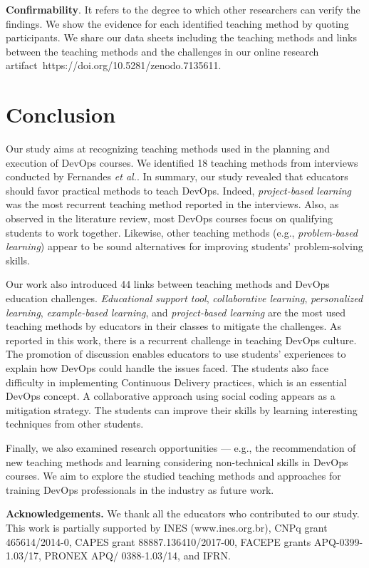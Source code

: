 \documentclass[10pt,conference]{IEEEtran}
\begin{document}
{\textbf{Confirmability}.} It refers to the degree to which other researchers can verify the findings. We show the evidence for each identified teaching method by quoting participants. We share our data sheets including the teaching methods and links between the teaching methods and the challenges in our online research artifact~https://doi.org/10.5281/zenodo.7135611.


\section{Conclusion}   \label{sec:conclusion}


Our study aims at recognizing teaching methods used in the planning and execution of DevOps courses. We identified 18 teaching methods from interviews conducted by Fernandes \textit{et al.}\cite{fernandes:2022}. In summary, our study revealed that educators should favor practical methods to teach DevOps. Indeed, \textit{project-based learning} was the most recurrent teaching method reported in the interviews. Also, as observed in the literature review, most DevOps courses focus on qualifying students to work together. Likewise, other teaching methods (e.g., \textit{problem-based learning}) appear to be sound alternatives for improving students' problem-solving skills.


Our work also introduced 44 links between teaching methods and DevOps education challenges. \textsl{Educational support tool}, \textsl{collaborative learning}, \textsl{personalized learning}, \textsl{example-based learning}, and \textsl{project-based learning} are the most used teaching methods by educators in their classes to mitigate the challenges. As reported in this work, there is a recurrent challenge in teaching DevOps culture.  The promotion of discussion enables educators to use students' experiences to explain how DevOps could handle the issues faced.  The students also face difficulty in implementing Continuous Delivery practices, which is an essential DevOps concept. A collaborative approach using social coding appears as a mitigation strategy. The students can improve their skills by learning interesting techniques from other students.

Finally, we also examined research opportunities — e.g., the recommendation of new teaching methods and learning considering non-technical skills in DevOps courses. We aim to explore the studied teaching methods and approaches for training DevOps professionals in the industry as future work.


\vspace{0.4cm}

\textbf{Acknowledgements.} We thank all the educators who contributed to our study. This work is partially supported by INES (www.ines.org.br), CNPq grant 465614/2014-0, CAPES grant 88887.136410/2017-00, FACEPE grants APQ-0399-1.03/17, PRONEX APQ/ 0388-1.03/14, and IFRN.



\end{document}
